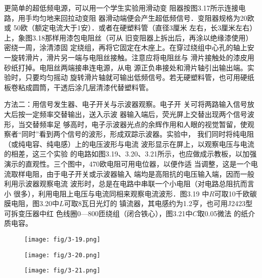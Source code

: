 更简单的超低频电源，可以用一个学生实验用滑动变
阻器按图3.17所示连接电路，用手均匀地来回拉动变阻
器滑动端便会产生超低频信号．变阻器规格为20欧或
50欧（额定电流大于1安）．或者在硬塑料管（直径3厘米
左右，长3厘米左右）上，象图3.18那样用漆包电阻丝（可从
旧变阻器上拆出后，再涂以绝缘漆使用）密绕一周，涂清漆固
定绕组，再将它固定在木座上。在穿过绕组中心孔的轴上安
一旋转滑片，滑片另一端与电阻丝接触。注意应将电阻丝与
滑片接触处的漆皮用砂纸打掉。电阻丝两端接串连电源，从电
源正负串接处和滑片轴引出输出端。实验时，只要均匀摇动
旋转滑片轴就可输出低频信号。若无硬塑料管，也可用硬纸
板卷粘成圆筒，干透后涂几层清漆代替塑料管。

方法二：用信号发生器、电子开关与示波器观察。电子开
关可将两路输入信号放大后按一定频率交替输出，送入示波
器输入端后，荧光屏上交替出现两个信号波形，当交替频率足
够高时，电子示波器光点的余辉作用和人眼的视觉暂留，使观
察者“同时”看到两个信号的波形，形成双踪示波器。实验中，
我们同时将纯电阻（或纯电容、纯电感）上的电压波形与电流
波形显示在屏上，以观察电压与电流的相差，这三个实验
的电路如图3.19、3.20、3.21所示，也应做成示教板，以加强
演示的直观性。三个图中，470欧电阻可用电位器，以便作适
当调整，这是一个电流取样电阻，由于电子开关或示波器输入
端均是高阻抗的电压输入端，因而一般利用示波器观察电流
波形时，总是在电路中串联一个小电阻（对电路总阻抗而言小
很多），利用电阻上电压与电流同相来观察电流波形．图3.19
中$R$可取10千欧碳膜电阻，图3.20中$L$可取8瓦日光灯的
镇流器，其电感约为1.2亨，也可用J2423型可拆变压器中红
色线圈0—800匝绕组（闭合铁心），图3.21中$C$取0.05微法
的纸介质电容。

\begin{figure}[htp]
    \centering
\texttt{[image: fig/3-19.png]}
    \caption{}
\end{figure}

\begin{figure}[htp]\centering
    \begin{minipage}[t]{0.48\textwidth}
    \centering
\texttt{[image: fig/3-20.png]}
    \caption{}
    \end{minipage}
    \begin{minipage}[t]{0.48\textwidth}
    \centering
\texttt{[image: fig/3-21.png]}
    \caption{}
    \end{minipage}
    \end{figure}

